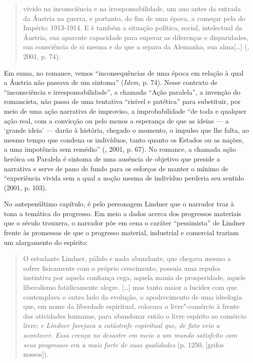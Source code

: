 \begin{quote}
vivido na inconsciência e na irresponsabilidade, um ano antes da entrada
da Áustria na guerra, e portanto, do fim de uma época, a começar pela do
Império: 1913-1914. E é também a situação política, social, intelectual
da Áustria, sua aparente capacidade para superar as diferenças e
disparidades, sua consciência de si mesma e do que a separa da Alemanha,
sua alma[\ldots{}] (, 2001, p. 74).
\end{quote}

Em suma, no romance, vemos ``inconsequências de uma época em relação à
qual a Áustria não passava de um sintoma'' (\emph{Idem}, p. 74). Nesse
contexto de ``inconsciência e irresponsabilidade'', a chamada ``Ação
paralela'', a invenção do romancista, não passa de uma tentativa
``risível e patética'' para substituir, por meio de uma ação narrativa
de improviso, a improbabilidade ``de toda e qualquer ação real, com a
convicção ou pelo menos a esperança de que as ideias --- a `grande ideia'
--- darão à história, chegado o momento, o impulso que lhe falta, ao
mesmo tempo que condena os indivíduos, tanto quanto os Estados ou as
nações, a uma impotência sem remédio'' (, 2001, p. 67). No
romance, a chamada ação heróica ou Paralela é sintoma de uma ausência de
objetivo que preside a narrativa e serve de pano de fundo para os
esforços de manter o mínimo de ``experiência vivida sem a qual a noção
mesma de indivíduo perderia seu sentido (2001, p. 103).

No antepenúltimo capítulo, é pelo personagem Lindner que o narrador traz
à tona a temática do progresso. Em meio a dados acerca dos progressos
materiais que o século  trouxera, o narrador põe em cena o caráter
``pessimista'' de Lindner frente às promessas de que o progresso
material, industrial e comercial trariam um alargamento do espírito:

\begin{quote}
O estudante Lindner, pálido e nada abundante, que chegava mesmo a sofrer
fisicamente com o próprio crescimento, possuía uma repulsa instintiva
por aquela confiança cega, aquela mania de prosperidade, aquele
liberalismo fatidicamente alegre. [\ldots{}] mas tanto maior a
lucidez com que contemplava o outro lado da evolução, o apodrecimento de
uma ideologia que, em nome da liberdade espiritual, colocara o
livre"-comércio à frente das atividades humanas, para abandonar então o
livre espírito ao comércio livre; \emph{e Lindner farejava a catástrofe
espiritual que, de fato veio a acontecer. Essa crença no desastre em
meio a um mundo satisfeito com seus progressos era a mais forte de suas
qualidades} (p. 1250, [grifos nossos]).
\end{quote}

